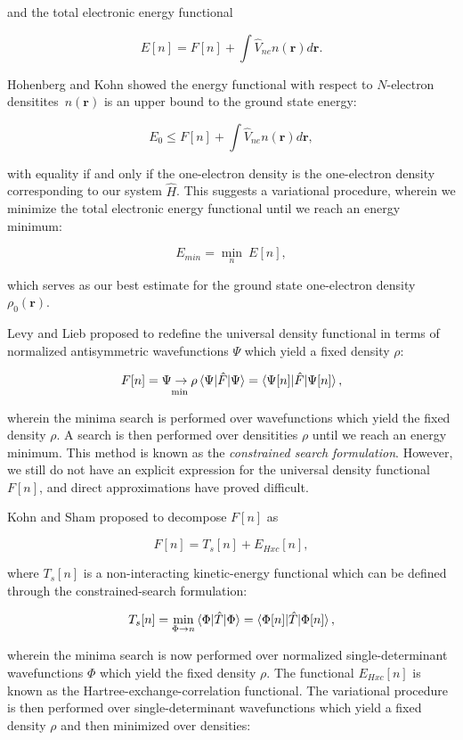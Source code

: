 and the total electronic energy functional

$$ E[n] = F[n] + \int \hat{V}_{ne} n(\bm{r}) d\bm{r} . $$

Hohenberg and Kohn showed the energy functional
with respect to $N$-electron densitites $n(\bm{r})$
is an upper bound to the ground state energy:

$$ E_0 \leq F[n] + \int \hat{V}_{ne} n(\bm{r}) d\bm{r} , $$

with equality if and only if the one-electron density
is the one-electron density corresponding to our system $\hat{H}$.
This suggests a variational procedure, wherein
we minimize the total electronic energy functional
until we reach an energy minimum:

$$ E_{min} = \underset{n}{\min} \ E[n] , $$

which serves as our best estimate for the ground state
one-electron density $\rho_0(\bm{r})$.
\par
Levy and Lieb proposed to redefine the universal density functional
in terms of normalized antisymmetric wavefunctions $\Psi$
which yield a fixed density $\rho$:

$$ F[n] = \underset{\min}{\Psi \rightarrow \rho}
    \braket{\Psi | \hat{F} | \Psi}
    = \braket{\Psi[n] | \hat{F} | \Psi[n]} , $$

wherein the minima search is performed over wavefunctions
which yield the fixed density $\rho$.
A search is then performed over densitities $\rho$
until we reach an energy minimum. This method
is known as the \textit{constrained search formulation}.
However, we still do not have an explicit expression
for the universal density functional $F[n]$, and
direct approximations have proved difficult.
\par
Kohn and Sham proposed to decompose $F[n]$ as

$$ F[n] = T_s[n] + E_{Hxc}[n] , $$

where $T_s[n]$ is a non-interacting kinetic-energy functional
which can be defined through the constrained-search formulation:

$$ T_s[n] = \underset{\Phi \rightarrow n}{\min}
    \braket{\Phi | \hat{T} | \Phi}
    = \braket{\Phi[n] | \hat{T} | \Phi[n]} , $$

wherein the minima search is now performed over normalized
single-determinant wavefunctions $\Phi$ which yield
the fixed density $\rho$. The functional
$E_{Hxc}[n]$ is known as the Hartree-exchange-correlation
functional. The variational procedure is then
performed over single-determinant wavefunctions
which yield a fixed density $\rho$ and then
minimized over densities:

